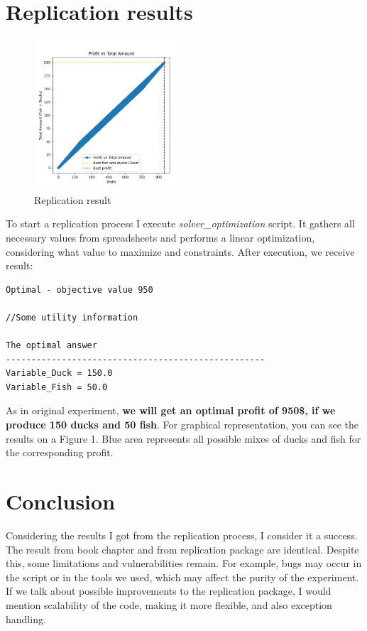 \documentclass[sigconf, nonacm]{acmart}
\begin{document}
\section{Replication results}
\begin{figure}
  \centering
  \includegraphics[width=0.5\textwidth]{figures/result_plot.png} 
  \caption{Replication result}
  \label{fig:yourlabel}
\end{figure}
 To start a replication process I execute \textit{solver\_optimization} script. It gathers all necessary values from spreadsheets and performs a linear optimization, considering what value to maximize and constraints. After execution, we receive result:
\begin{verbatim}
Optimal - objective value 950

//Some utility information

The optimal answer
---------------------------------------------------
Variable_Duck = 150.0
Variable_Fish = 50.0
\end{verbatim}
As in original experiment, \textbf{we will get an optimal profit of 950\$, if we produce 150 ducks and 50 fish}. For graphical representation, you can see the results on a Figure 1. Blue area represents all possible mixes of ducks and fish for the corresponding profit.

\section{Conclusion}
Considering the results I got from the replication process, I consider it a success. The result from book chapter and from replication package are identical. 
Despite this, some limitations and vulnerabilities remain. For example, bugs may occur in the script or in the tools we used, which may affect the purity of the experiment. If we talk about possible improvements to the replication package, I would mention scalability of the code, making it more flexible, and also exception handling.




\end{document}
